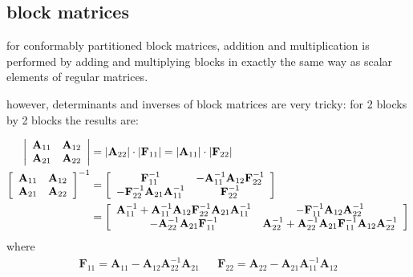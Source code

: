 \documentclass[11pt]{article}
\newcommand{\mat}[1]{\mathbf{#1}}
\newcommand{\inv}{{-1}}
\numberwithin{equation}{subsection}
\begin{document}
\subsection{block matrices}

for conformably partitioned block matrices, addition and multiplication is
performed by adding and multiplying blocks in exactly the same way as scalar
elements of regular matrices.

however, determinants and inverses of block matrices are very tricky: for 
2 blocks by 2 blocks the results are:

\begin{align}
	\left|
	\begin{array}{cc}
		\mat{A}_{11} & \mat{A}_{12} \\
		\mat{A}_{21} & \mat{A}_{22} 
	\end{array} \right| & = |\mat{A}_{22}| \cdot |\mat{F}_{11}|
	= |\mat{A}_{11}| \cdot |\mat{F}_{22}| \\
	\left[ \begin{array}{cc}
		\mat{A}_{11} & \mat{A}_{12} \\
		\mat{A}_{21} & \mat{A}_{22} 
	\end{array} 
	\right]^\inv & =
	\left[
	\begin{array}{cc}
	\mat{F}_{11}^\inv & -\mat{A}_{11}^\inv \mat{A}_{12} \mat{F}_{22}^\inv \\
	- \mat{F}_{22}^\inv \mat{A}_{21} \mat{A}_{11}^\inv & \mat{F}_{22}^\inv 
	\end{array}
	\right] \\
	& = 
	\left[ 
	\begin{array}{cc}
	\mat{A}_{11}^\inv + \mat{A}_{11}^\inv \mat{A}_{12}
	\mat{F}_{22}^\inv \mat{A}_{21} \mat{A}_{11}^\inv 
	&
	- \mat{F}_{11}^\inv \mat{A}_{12} \mat{A}_{22}^\inv
	\\
	- \mat{A}_{22}^\inv \mat{A}_{21} \mat{F}_{11}^\inv
	&
	\mat{A}_{22}^\inv + \mat{A}_{22}^\inv \mat{A}_{21} \mat{F}_{11}^\inv
	\mat{A}_{12} \mat{A}_{22}^\inv
	\end{array}
	\right] \notag
\end{align}
where 
\begin{align*}
\mat{F}_{11} = \mat{A}_{11} - \mat{A}_{12} \mat{A}_{22}^{-1} \mat{A}_{21}
& &
\mat{F}_{22} = \mat{A}_{22} - \mat{A}_{21} \mat{A}_{11}^{-1} \mat{A}_{12}
\end{align*}
\end{document}

